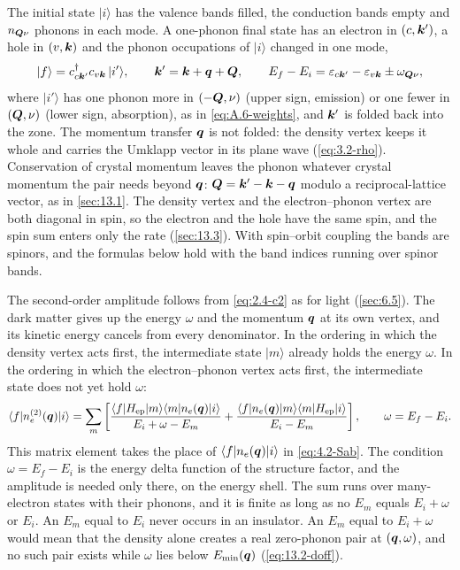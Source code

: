 The initial state $|i\rangle$ has the valence bands filled, the conduction bands empty and $n_{\bm{Q}\nu}$ phonons in each mode. A one-phonon final state has an electron in $(c,\bm{k}')$, a hole in $(v,\bm{k})$ and the phonon occupations of $|i\rangle$ changed in one mode,
\begin{equation}
  |f\rangle = c^\dagger_{c\bm{k}'}c_{v\bm{k}}\,|i'\rangle , \qquad
  \bm{k}' = \bm{k} + \bm{q} + \bm{Q} , \qquad
  E_f - E_i = \varepsilon_{c\bm{k}'} - \varepsilon_{v\bm{k}} \pm \omega_{\bm{Q}\nu} ,
  \label{eq:13.2-final}
\end{equation}
where $|i'\rangle$ has one phonon more in $(-\bm{Q},\nu)$ (upper sign, emission) or one fewer in $(\bm{Q},\nu)$ (lower sign, absorption), as in \cref{eq:A.6-weights}, and $\bm{k}'$ is folded back into the zone. The momentum transfer $\bm{q}$ is not folded: the density vertex keeps it whole and carries the Umklapp vector in its plane wave (\cref{eq:3.2-rho}). Conservation of crystal momentum leaves the phonon whatever crystal momentum the pair needs beyond $\bm{q}$: $\bm{Q} = \bm{k}' - \bm{k} - \bm{q}$ modulo a reciprocal-lattice vector, as in \cref{sec:13.1}. The density vertex and the electron--phonon vertex are both diagonal in spin, so the electron and the hole have the same spin, and the spin sum enters only the rate (\cref{sec:13.3}). With spin--orbit coupling the bands are spinors, and the formulas below hold with the band indices running over spinor bands.

The second-order amplitude follows from \cref{eq:2.4-c2} as for light (\cref{sec:6.5}). The dark matter gives up the energy $\omega$ and the momentum $\bm{q}$ at its own vertex, and its kinetic energy cancels from every denominator. In the ordering in which the density vertex acts first, the intermediate state $|m\rangle$ already holds the energy $\omega$. In the ordering in which the electron--phonon vertex acts first, the intermediate state does not yet hold $\omega$:
\begin{equation}
  \langle f|n_e^{(2)}(\bm{q})|i\rangle = \sum_m\left[\frac{\langle f|H_{\mathrm{ep}}|m\rangle\langle m|n_e(\bm{q})|i\rangle}{E_i + \omega - E_m} + \frac{\langle f|n_e(\bm{q})|m\rangle\langle m|H_{\mathrm{ep}}|i\rangle}{E_i - E_m}\right] , \qquad
  \omega = E_f - E_i .
  \label{eq:13.2-T}
\end{equation}
This matrix element takes the place of $\langle f|n_e(\bm{q})|i\rangle$ in \cref{eq:4.2-Sab}. The condition $\omega = E_f - E_i$ is the energy delta function of the structure factor, and the amplitude is needed only there, on the energy shell. The sum runs over many-electron states with their phonons, and it is finite as long as no $E_m$ equals $E_i + \omega$ or $E_i$. An $E_m$ equal to $E_i$ never occurs in an insulator. An $E_m$ equal to $E_i + \omega$ would mean that the density alone creates a real zero-phonon pair at $(\bm{q},\omega)$, and no such pair exists while $\omega$ lies below $E_{\mathrm{min}}(\bm{q})$ (\cref{eq:13.2-doff}).


